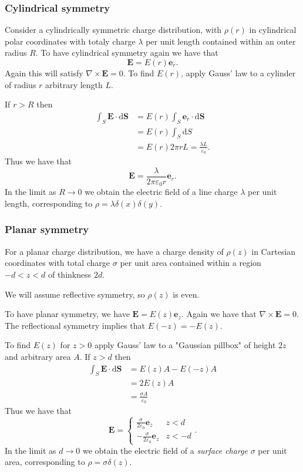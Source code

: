 \documentclass{article}
\begin{document}
\subsubsection{Cylindrical symmetry}
Consider a cylindrically symmetric charge distribution, with $ \rho(r) $ in cylindrical polar coordinates with totaly charge $ \lambda $ per unit length contained within an outer radius $ R $. To have cylindrical symmetry again we have that
\[
  \mathbf E = E(r)\mathbf e_r.
\]
Again this will satisfy $ \nabla\times \mathbf E = 0 $. To find $ E(r) $, apply Gauss' law to a cylinder of radius $ r $ arbitrary length $ L $.\par
If $ r>R $ then
\begin{align*}
	\int_S\mathbf E\cdot\mathrm d\mathbf S &= E(r)\int_S \mathbf e_r\cdot\mathrm d\mathbf S\\
					       &= E(r)\int_S\mathrm dS\\
					       &= E(r)2\pi rL = \frac{\lambda L}{\varepsilon_0}.
\end{align*}
Thus we have that
\[
	\mathbf E = \frac{\lambda}{2\pi \varepsilon_0 r} \mathbf e_r.
\]
In the limit as $ R\to 0 $ we obtain the electric field of a line charge $ \lambda $ per unit length, corresponding to $ \rho = \lambda\delta(x)\delta(y) $.
\subsubsection{Planar symmetry}
For a planar charge distribution, we have a charge density of $ \rho(z) $ in Cartesian coordinates with total charge $ \sigma $ per unit area contained within a region $ -d<z< d $ of thinkness $ 2d $.\par
We will assume reflective symmetry, so $ \rho(z) $ is even.\par
To have planar symmetry, we have $ \mathbf E = E(z)\mathbf e_z $. Again we have that $ \nabla\times \mathbf E = 0 $. The reflectional symmetry implies that $ E(-z) = -E(z) $.
\par
To find $ E(z) $ for $ z>0 $ apply Gauss' law to a "Gaussian pillbox" of height $ 2z $ and arbitrary area $ A $. If $ z>d $ then
\begin{align*}
	\int_S \mathbf E \cdot\mathrm d \mathbf S &= E(z)A-E(-z)A\\
						&= 2E(z)A\\
						&= \frac{\sigma A}{\varepsilon_0}
\end{align*}
Thus we have that
\[
  \mathbf E = \begin{cases}
	  \frac{\sigma}{2\varepsilon_0}\mathbf e_z & z< d\\
	  -\frac\sigma{2\varepsilon_0}\mathbf e_z & z< -d
  \end{cases}.
\]
In the limit as $ d\to 0 $ we obtain the electric field of a \textit{surface charge} $ \sigma $ per unit area, corresponding to $ \rho = \sigma\delta(z) $.
\end{document}
